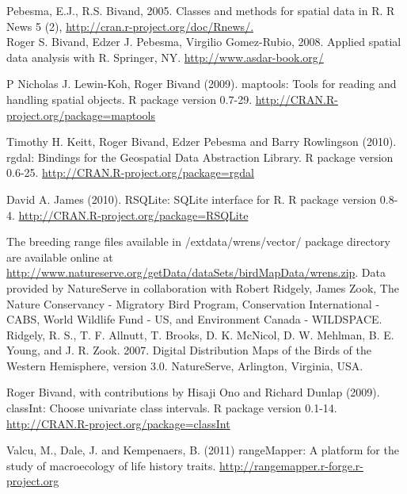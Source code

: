 \documentclass[ a4paper ]{article}
\begin{document}
\begin{thebibliography}{1}
	
	Pebesma, E.J., R.S. Bivand, 2005. Classes and methods for spatial data in R. R News 5 (2), 
			\url{http://cran.r-project.org/doc/Rnews/.}\\
	Roger S. Bivand, Edzer J. Pebesma, Virgilio Gomez-Rubio, 2008. Applied spatial data analysis with R. Springer, NY. 
			\url{http://www.asdar-book.org/}
			
	P Nicholas J. Lewin-Koh, Roger Bivand (2009). maptools: Tools for reading and handling spatial objects. R package version 0.7-29. \url{http://CRAN.R-project.org/package=maptools}			

	Timothy H. Keitt, Roger Bivand, Edzer Pebesma and Barry Rowlingson (2010). rgdal: Bindings for the Geospatial Data
	Abstraction Library. R package version 0.6-25. \url{http://CRAN.R-project.org/package=rgdal }

 David A. James (2010). RSQLite: SQLite interface for R. R package version 0.8-4. \url{http://CRAN.R-project.org/package=RSQLite}
  
	 The breeding range files available in /extdata/wrens/vector/  package directory are available online at \url{http://www.natureserve.org/getData/dataSets/birdMapData/wrens.zip}. Data provided by NatureServe in collaboration with Robert Ridgely, James Zook, The Nature Conservancy - Migratory Bird Program, Conservation International - CABS, World Wildlife Fund - US, and Environment Canada - WILDSPACE.\\
Ridgely, R. S., T. F. Allnutt, T. Brooks, D. K. McNicol, D. W. Mehlman, B. E. Young, and J. R. Zook. 2007. Digital Distribution Maps of the Birds of the Western Hemisphere, version 3.0. NatureServe, Arlington, Virginia, USA.

Roger Bivand, with contributions by Hisaji Ono and Richard Dunlap (2009). classInt: Choose univariate class intervals. R package version 0.1-14. \url{http://CRAN.R-project.org/package=classInt}

Valcu, M., Dale, J. and Kempenaers, B. (2011) rangeMapper: A platform for the study of macroecology of life history traits. \url{http://rangemapper.r-forge.r-project.org}
\end{thebibliography}
\end{document}
